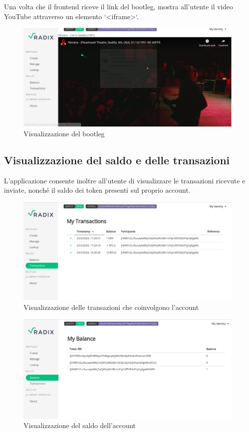 Una volta che il frontend riceve il link del bootleg, mostra all'utente il video YouTube attraverso un elemento `<iframe>`.
\begin{figure}[H]
    \includegraphics[width=\linewidth]{images/application/watch.png}
    \caption{Visualizzazione del bootleg}
    \label{fig:watch}
\end{figure}

\subsection{Visualizzazione del saldo e delle transazioni}

L'applicazione consente inoltre all'utente di visualizzare le transazioni ricevute e inviate, nonché il saldo dei token presenti sul proprio account.

\begin{figure}[H]
    \includegraphics[width=\linewidth]{images/application/transactions.png}
    \caption{Visualizzazione delle transazioni che coinvolgono l'account}
    \label{fig:transactions}
\end{figure}

\begin{figure}[H]
    \includegraphics[width=\linewidth]{images/application/balance.png}
    \caption{Visualizzazione del saldo dell'account}
    \label{fig:balance}
\end{figure}